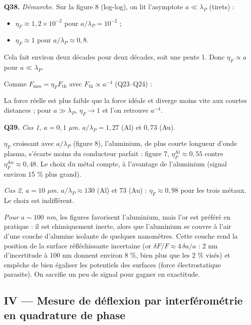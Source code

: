 \documentclass[11pt,a4paper]{article}
\providecommand{\tightlist}{\setlength{\itemsep}{0pt}\setlength{\parskip}{0pt}}
\newcommand{\equationajustee}[1]{%
  \sbox{\boiteequation}{$\displaystyle #1$}%
  \ifdim\wd\boiteequation>\linewidth
    \[\resizebox{\linewidth}{!}{\usebox{\boiteequation}}\]%
  \else
    \[#1\]%
  \fi}
\begin{document}
\textbf{Q38.} \emph{Démarche.} Sur la figure 8 (log-log), on lit l'asymptote \(a\ll\lambda_P\) (tirets) :

\begin{itemize}
\tightlist
\item
  \(\eta_F\approx1{,}2\times10^{-2}\) pour \(a/\lambda_P=10^{-2}\) ;
\item
  \(\eta_F\approx1\) pour \(a/\lambda_P\approx0{,}8\).
\end{itemize}

Cela fait environ deux décades pour deux décades, soit une pente 1. Donc \(\eta_F\propto a\) pour \(a\ll\lambda_P\).

Comme \(F_{\mathrm{mes}}=\eta_FF_{\mathrm{th}}\) avec \(F_{\mathrm{th}}\propto a^{-4}\) (Q23--Q24) :

\equationajustee{\boxed{\|F_{\mathrm{mes}}\|\propto a^{\alpha'}}}

\equationajustee{\boxed{\alpha'=-3}}

La force réelle est plus faible que la force idéale et diverge moins vite aux courtes distances ; pour \(a\gg\lambda_P\), \(\eta_F\to1\) et l'on retrouve \(a^{-4}\).

\textbf{Q39.} \emph{Cas 1, \(a=0{,}1\) µm.} \(a/\lambda_P=1{,}27\) (Al) et \(0{,}73\) (Au).

\(\eta_F\) croissant avec \(a/\lambda_P\) (figure 8), l'aluminium, de plus courte longueur d'onde plasma, s'écarte moins du conducteur parfait : figure 7, \(\eta_F^{\mathrm{Al}}\approx0{,}55\) contre \(\eta_F^{\mathrm{Au}}\approx0{,}48\). Le choix du métal compte, à l'avantage de l'aluminium (signal environ 15 \% plus grand).

\emph{Cas 2, \(a=10\) µm.} \(a/\lambda_P\approx130\) (Al) et \(73\) (Au) : \(\eta_F\approx0{,}98\) pour les trois métaux. Le choix est indifférent.

\emph{Pour \(a\sim100\) nm}, les figures favorisent l'aluminium, mais l'or est préféré en pratique : il est chimiquement inerte, alors que l'aluminium se couvre à l'air d'une couche d'alumine isolante de quelques nanomètres. Cette couche rend la position de la surface réfléchissante incertaine (or \(\delta F/F\approx4\,\delta a/a\) : 2 nm d'incertitude à 100 nm donnent environ 8 \%, bien plus que les 2 \% visés) et empêche de bien égaliser les potentiels des surfaces (force électrostatique parasite). On sacrifie un peu de signal pour gagner en exactitude.

\hypertarget{iv-mesure-de-duxe9flexion-par-interfuxe9romuxe9trie-en-quadrature-de-phase}{%
\subsection{IV --- Mesure de déflexion par interférométrie en quadrature de phase}\label{iv-mesure-de-duxe9flexion-par-interfuxe9romuxe9trie-en-quadrature-de-phase}}
\end{document}
